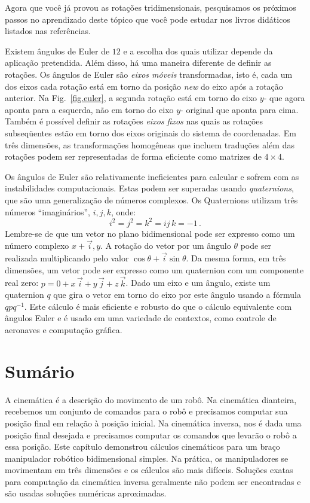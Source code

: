 Agora que você já provou as rotações tridimensionais, pesquisamos os próximos passos no aprendizado deste tópico que você pode estudar nos livros didáticos listados nas referências.

Existem ângulos de Euler de $12$ e a escolha dos quais utilizar depende da aplicação pretendida. Além disso, há uma maneira diferente de definir as rotações. Os ângulos de Euler são \emph{eixos móveis} transformadas, isto é, cada um dos eixos  cada rotação está em torno da posição \emph{new} do eixo após a rotação anterior. Na Fig.~\ref{fig.euler}, a segunda rotação está em torno do eixo $y$- que agora aponta para a esquerda, não em torno do eixo $y$- original que aponta para cima. Também é possível definir as rotações \emph{eixos fixos} nas quais as rotações subseqüentes estão em torno dos eixos originais do sistema de coordenadas. Em três dimensões, as transformações homogêneas que incluem traduções além das rotações podem ser representadas de forma eficiente como matrizes de $4\times 4$.

Os ângulos de Euler são relativamente ineficientes para calcular e sofrem com as instabilidades computacionais. Estas podem ser superadas usando \emph{quaternions}, que são uma generalização de números complexos. Os Quaternions utilizam três números ``imaginários'', $i,j,k$, onde:
\[
i^2 = j^2 = k^2 = ij\,k = -1\,.
\]
Lembre-se de que um vetor no plano bidimensional pode ser expresso como um número complexo $x+\vec{i},y$. A rotação do vetor por um ângulo $\theta$ pode ser realizada multiplicando pelo valor $\cos \theta + \vec{i} \sin\theta$.  Da mesma forma, em três dimensões, um vetor pode ser expresso como um quaternion com um componente real zero: $p=0+x\,\vec{i} + y\,\vec{j} + z\,\vec{k}$. Dado um eixo e um ângulo, existe um quaternion $q$ que gira o vetor em torno do eixo por este ângulo usando a fórmula $qpq^{-1}$. Este cálculo é mais eficiente e robusto do que o cálculo equivalente com ângulos Euler e é usado em uma variedade de contextos, como controle de aeronaves e computação gráfica.


\section{Sumário}

A cinemática é a descrição do movimento de um robô. Na cinemática dianteira, recebemos um conjunto de comandos para o robô e precisamos computar sua posição final em relação à posição inicial. Na cinemática inversa, nos é dada uma posição final desejada e precisamos computar os comandos que levarão o robô a essa posição. Este capítulo demonstrou cálculos cinemáticos para um braço manipulador robótico bidimensional simples. Na prática, os manipuladores se movimentam em três dimensões e os cálculos são mais difíceis. Soluções exatas para computação da cinemática inversa geralmente não podem ser encontradas e são usadas soluções numéricas aproximadas.

